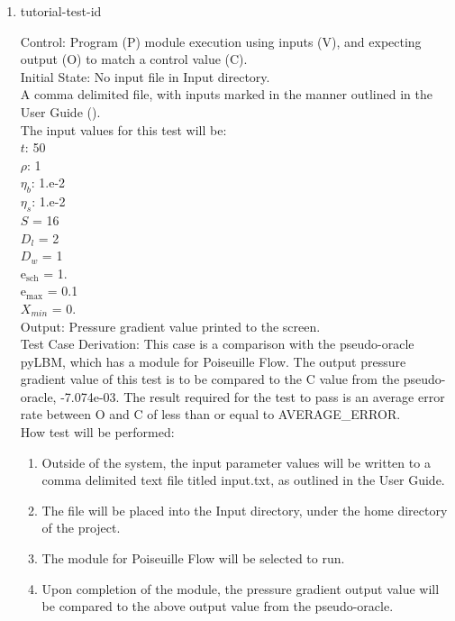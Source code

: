 \documentclass[12pt, titlepage]{article}
\newcounter{testcounter} %
\begin{document}
\begin{enumerate}

\item{tutorial-test-id\thetestcounter \\}

Control: Program (P) module execution using inputs (V), and expecting output (O) to match a control value (C).\\
					
Initial State: No input file in Input directory.\\
					
A comma delimited file, with inputs marked in the manner outlined in the User
Guide (\citet{LBM_UserGuide_PM}).\\The input values for this test will be:\\
$t$: 50\\
$\rho$: 1\\
$\eta_b$: 1.e-2\\
$\eta_s$: 1.e-2\\
$S$ = 16\\
$D_{l}$ = 2\\
$D_{w}$ = 1\\
$\mathrm{e_{sch}}$ = 1.\\
$\mathrm{e_{max}}$ = 0.1\\
$X_{min}$ = 0.\\

					
Output: Pressure gradient value printed to the screen.  \\

Test Case Derivation: This case is a comparison with the pseudo-oracle pyLBM,
which has a module for Poiseuille Flow. The output pressure gradient value of
this test is to be compared to the C value from the pseudo-oracle,
-7.074e-03. The result required for the test to pass is an average error rate
between O and C of less than or equal to AVERAGE\_ERROR.\\
					
How test will be performed: 

\begin{enumerate}
\item Outside of the system, the input parameter values will be written to a
comma delimited text file titled input.txt, as outlined in the User Guide.
\item The file will be placed into the Input directory, under the home directory
of the project.
\item The module for Poiseuille Flow will be selected to run.
\item Upon completion of the module, the pressure gradient output value will be
compared to the above output value from the pseudo-oracle.
\end{enumerate}			


\end{enumerate}
\end{document}
